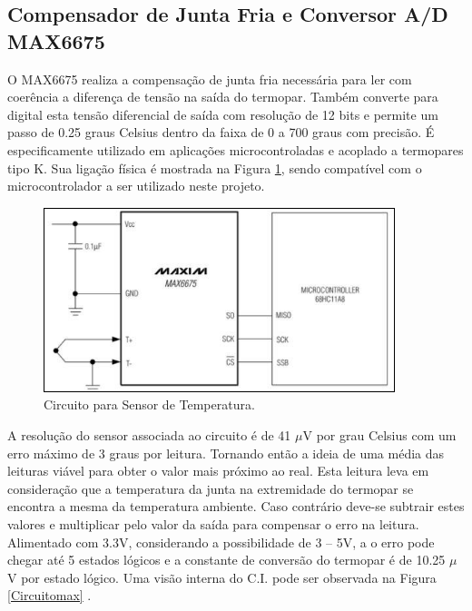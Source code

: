 \subsection{Compensador de Junta Fria e Conversor A/D MAX6675}
O MAX6675 realiza a compensação de junta fria necessária para ler com coerência a diferença de tensão na saída do termopar. Também converte para digital esta tensão diferencial de saída com resolução de 12 bits e permite um passo de 0.25 graus Celsius dentro da faixa de 0 a 700 graus com precisão. 
É especificamente utilizado em aplicações microcontroladas e acoplado a termopares tipo K. Sua ligação física é mostrada na Figura \ref{Circuito}, sendo compatível com o microcontrolador a ser utilizado neste projeto.
\begin{figure}[h!]
	\centering
	\includegraphics[keepaspectratio=true,scale= 0.9]{figuras/sensor_temp.PNG}
	\caption{ Circuito para Sensor de Temperatura.}
	\label{Circuito}
\end{figure}
A resolução do sensor associada ao circuito é de 41 $\mu$V por grau Celsius com um erro máximo de 3 graus por leitura. Tornando então a ideia de uma média das leituras viável para obter o valor mais próximo ao real. Esta leitura leva em consideração que a temperatura da junta na extremidade do termopar se encontra a mesma da temperatura ambiente. Caso contrário deve-se subtrair estes valores e multiplicar pelo valor da saída para compensar o erro na leitura.
Alimentado com 3.3V, considerando a possibilidade de 3 – 5V, a o erro pode chegar até 5 estados lógicos e a constante de conversão do termopar é de 10.25 $\mu$V por estado lógico.
Uma visão interna do C.I. pode ser observada na Figura \ref{Circuitomax} .
